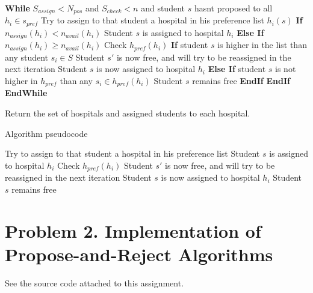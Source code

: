 \documentclass{article}
\begin{document}
\textbf{While} $S_{assign}<N_{pos}$ and $S_{check}<n$ and student $s$ hasnt proposed to all $h_i \in s_{pref}$\newline
 Try to assign to that student a hospital in his preference list $h_i(s)$\newline
 \textbf{If} $n_{assign} (h_i) < n_{avail} (h_i)$\newline
  Student $s$ is assigned to hospital $h_i$\newline
 \textbf{Else If} $n_{assign} (h_i) \geq n_{avail} (h_i)$\newline
  Check $h_{pref} (h_i)$\newline
  \textbf{If} student $s$ is higher in the list than any student $s_i \in S$\newline
   Student $s'$ is now free, and will try to be reassigned in the next iteration\newline
   Student $s$ is now assigned to hospital $h_i$\newline
  \textbf{Else If} student $s$ is not higher in $h_{pref}$ than any $s_i \in h_{pref} (h_i)$\newline
   Student $s$ remains free\newline
\textbf{EndIf}
\textbf{EndIf}
\textbf{EndWhile}

Return the set of hospitals and assigned students to each hospital.
  

\begin{algorithm}
\caption{Algorithm pseudocode}\label{euclid}
\begin{algorithmic}
\State Try to assign to that student a hospital in his preference list
\State Student $s$ is assigned to hospital $h_i$
\State Check $h_{pref} (h_i)$
\State Student $s'$ is now free, and will try to be reassigned in the next iteration
\State Student $s$ is now assigned to hospital $h_i$
\State Student $s$ remains free
\EndIf
\EndIf
\EndWhile
\end{algorithmic}
\end{algorithm}

\section*{Problem 2. Implementation of Propose-and-Reject Algorithms}

See the source code attached to this assignment.
\end{document}
